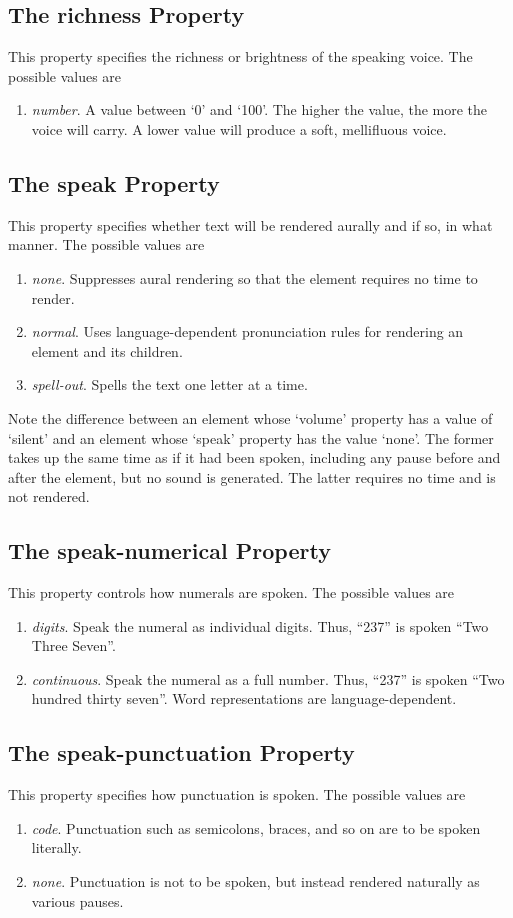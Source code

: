 \documentclass[a4paper,oneside]{book}
\numberwithin{equation}{chapter}
\begin{document}
\subsection{The richness Property}
This property specifies the richness or brightness of the speaking voice. The possible values are
\begin{enumerate}
\item \textit{number}. A value between `0' and `100'. The higher the value, the more the voice will carry. A lower value will produce a soft, mellifluous voice.
\end{enumerate}
\subsection{The speak Property}
This property specifies whether text will be rendered aurally and if so, in what manner. The possible values are 
\begin{enumerate}
\item \textit{none}. Suppresses aural rendering so that the element requires no time to render.
\item \textit{normal}. Uses language-dependent pronunciation rules for rendering an element and its children.
\item \textit{spell-out}. Spells the text one letter at a time.
\end{enumerate}
Note the difference between an element whose `volume' property has a value of `silent' and an element whose `speak' property has the value `none'. The former takes up the same time as if it had been spoken, including any pause before and after the element, but no sound is generated. The latter requires no time and is not rendered.
\subsection{The speak-numerical Property}
This property controls how numerals are spoken. The possible values are
\begin{enumerate}
\item \textit{digits}. Speak the numeral as individual digits. Thus, ``237'' is spoken ``Two Three Seven''.
\item \textit{continuous}. Speak the numeral as a full number. Thus, ``237'' is spoken ``Two hundred thirty seven''. Word representations are language-dependent.
\end{enumerate}
\subsection{The speak-punctuation Property}
This property specifies how punctuation is spoken. The possible values are
\begin{enumerate}
\item \textit{code}. Punctuation such as semicolons, braces, and so on are to be spoken literally.
\item \textit{none}. Punctuation is not to be spoken, but instead rendered naturally as various pauses.
\end{enumerate}
\end{document}
